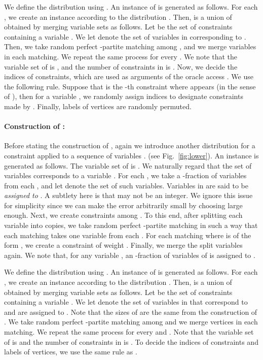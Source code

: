 \documentclass[letterpaper, 11pt]{article}
\begin{document}
We define the distribution  using .
An instance  of  is generated as follows.
For each ,
we create an instance  according to the distribution .
Then,  is a union of  obtained by merging variable sets as follows.
Let  be the set of constraints containing a variable .
We let  denote the set of variables in  corresponding to .
Then, we take random perfect -partite matching among ,
and we merge variables in each matching.
We repeat the same process for every .
We note that the variable set of  is ,
and the number of constraints in  is .
Now, we decide the indices of constraints, 
which are used as arguments of the oracle access .
We use the following rule.
Suppose that  is the -th constraint where  appears (in the sense of ),
then for a variable , 
we randomly assign  indices  to designate  constraints made by .
Finally, labels of vertices are randomly permuted.

\paragraph{Construction of :}
Before stating the construction of ,
again we introduce another distribution  for a constraint  applied to a sequence of variables . (see Fig.~\ref{fig:lower}).
An instance  is generated as follows.
The variable set of  is .
We naturally regard that the set of variables  corresponds to a variable .
For each ,
we take a -fraction of variables from each , and let  denote the set of such variables.
Variables in  are said to be \textit{assigned to }.
A subtlety here is that  may not be an integer.
We ignore this issue for simplicity since we can make the error arbitrarily small by choosing  large enough.
Next, we create  constraints among .
To this end, after splitting each variable into  copies,
we take random perfect -partite matching in such a way that each matching takes one variable from each .
For each matching  where  is of the form ,
we create a constraint  of weight .
Finally, we merge the split variables again.
We note that, for any variable ,
an -fraction of variables of  is assigned to .

We define the distribution  using .
An instance  of  is generated as follows.
For each ,
we create an instance  according to the distribution .
Then,  is a union of  obtained by merging variable sets as follows.
Let  be the set of constraints containing a variable .
We let  denote the set of variables in  that correspond to  and are assigned to .
Note that the sizes of  are the same from the construction of .
We take random perfect -partite matching among  and we merge vertices in each matching.
We repeat the same process for every  and .
Note that the variable set of  is  and the number of constraints in  is .
To decide the indices of constraints and labels of vertices, we use the same rule as .
\end{document}
